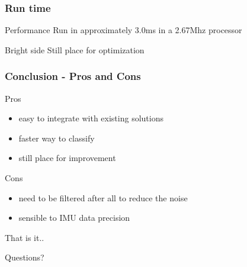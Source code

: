 \documentclass{beamer}
\begin{document}
	\begin{frame}
		\frametitle{Run time}

		\begin{alertblock}{Performance}
			Run in approximately 3.0ms in a 2.67Mhz processor
		\end{alertblock}		
		
		\begin{exampleblock}{Bright side}
			Still place for optimization
		\end{exampleblock}				
		
	\end{frame}	

	\begin{frame}
		\frametitle{Conclusion - Pros and Cons}
		
		\begin{block}{Pros}
			\begin{itemize}
			\item easy to integrate with existing solutions
			\item faster way to classify
			\item still place for improvement
			\end{itemize}
		\end{block}		
		
		\begin{block}{Cons}
			\begin{itemize}
			\item need to be filtered after all to reduce the noise
			\item sensible to IMU data precision
			\end{itemize}
		\end{block}
		
	\end{frame}

%			
%
%

	\begin{frame}{That is it..}
	\begin{alertblock}{}
		\center
		Questions?
	\end{alertblock}
	\end{frame} 	
 	


{} 	
\end{document}
